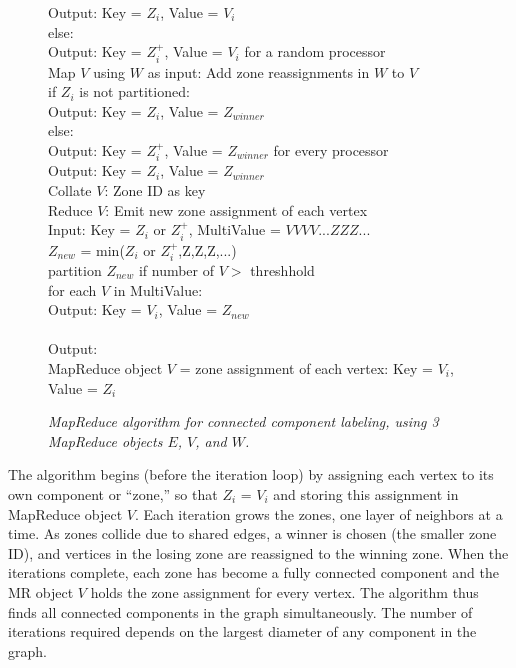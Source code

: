 \begin{figure}[htb]
\begin{center}
{\begin{minipage}{\textwidth}
\begin{tabbing}
    \> \> \> Output: Key = $Z_i$, Value = $V_i$ \\
    \> \> else: \\
    \> \> \> Output: Key = $Z_i^+$, Value = $V_i$ for a random processor \\
 Map $V$ using $W$ as input: Add zone reassignments in $W$ to $V$ \\
    \> \> if $Z_i$ is not partitioned: \\
    \> \> \> Output: Key = $Z_i$, Value = $Z_{winner}$ \\
    \> \> else: \\
    \> \> \> Output: Key = $Z_i^+$, Value = $Z_{winner}$ for every processor \\
    \> \> \> Output: Key = $Z_i$, Value = $Z_{winner}$ \\
 Collate $V$: Zone ID as key \\
 Reduce $V$: Emit new zone assignment of each vertex \\
       \> \> Input: Key = $Z_i$ or $Z_i^+$, MultiValue = $V V V V ... Z Z Z ...$ \\
       \> \> $Z_{new}$ = min($Z_i$ or $Z_i^+$,Z,Z,Z,...) \\
       \> \> partition $Z_{new}$ if number of $V >$ threshhold \\
       \> \> for each $V$ in MultiValue: \\
       \> \> \> Output: Key = $V_i$, Value = $Z_{new}$ \\
\\
Output: \\
\> MapReduce object $V$ = zone assignment of each vertex: Key = $V_i$, Value = $Z_i$ \\

  \end{tabbing}
 \end{minipage}}\end{center}

 \caption{\it MapReduce algorithm for connected component labeling,
 using 3 MapReduce objects $E$, $V$, and $W$.}

 \label{fig:cc}
\end{figure}

The algorithm begins (before the iteration loop) by assigning each
vertex to its own component or ``zone,'' so that $Z_i$ = $V_i$ and
storing this assignment in MapReduce object $V$.  Each iteration grows
the zones, one layer of neighbors at a time.  As zones collide due to
shared edges, a winner is chosen (the smaller zone ID), and vertices
in the losing zone are reassigned to the winning zone.  When the
iterations complete, each zone has become a fully connected component
and the MR object $V$ holds the zone assignment for every vertex.  The
algorithm thus finds all connected components in the graph
simultaneously.  The number of iterations required depends on the
largest diameter of any component in the graph.

